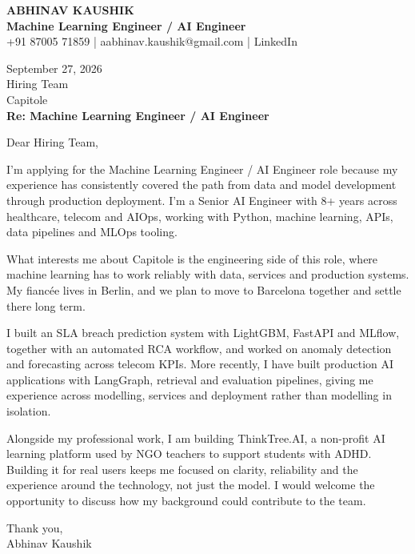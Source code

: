 \documentclass[10pt,a4paper]{article}
\begin{document}
\begin{center}
{\Large\bfseries ABHINAV KAUSHIK}\\[2pt]
{\bfseries Machine Learning Engineer / AI Engineer}\\[2pt]
+91 87005 71859 \quad | \quad aabhinav.kaushik@gmail.com \quad | \quad LinkedIn
\end{center}
\vspace{8pt}
September 27, 2026\\[6pt]
Hiring Team\\
Capitole\\[4pt]
\textbf{Re: Machine Learning Engineer / AI Engineer}

Dear Hiring Team,

I’m applying for the Machine Learning Engineer / AI Engineer role because my experience has consistently covered the path from data and model development through production deployment. I’m a Senior AI Engineer with 8+ years across healthcare, telecom and AIOps, working with Python, machine learning, APIs, data pipelines and MLOps tooling.

What interests me about Capitole is the engineering side of this role, where machine learning has to work reliably with data, services and production systems. My fiancée lives in Berlin, and we plan to move to Barcelona together and settle there long term.

I built an SLA breach prediction system with LightGBM, FastAPI and MLflow, together with an automated RCA workflow, and worked on anomaly detection and forecasting across telecom KPIs. More recently, I have built production AI applications with LangGraph, retrieval and evaluation pipelines, giving me experience across modelling, services and deployment rather than modelling in isolation.

Alongside my professional work, I am building ThinkTree.AI, a non-profit AI learning platform used by NGO teachers to support students with ADHD. Building it for real users keeps me focused on clarity, reliability and the experience around the technology, not just the model. I would welcome the opportunity to discuss how my background could contribute to the team.

Thank you,\\
Abhinav Kaushik
\end{document}
